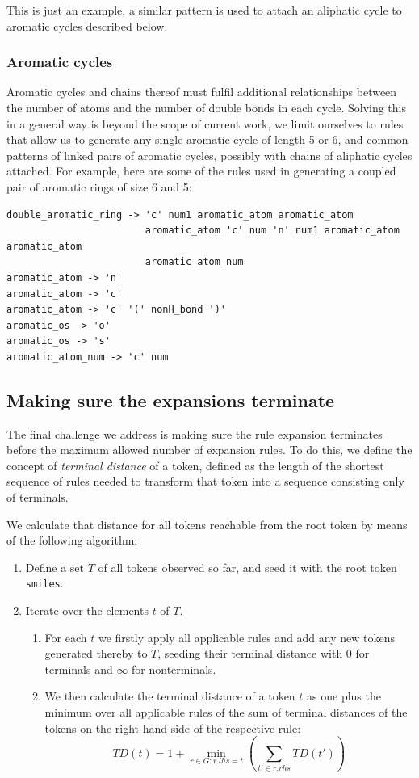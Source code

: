 \documentclass[11pt]{article}
\begin{document}
This is just an example, a similar pattern is used to attach an aliphatic cycle to aromatic cycles described below. 
\subsubsection{Aromatic cycles}
Aromatic cycles and chains thereof must fulfil additional relationships between the number of atoms and the number of double bonds in each cycle. Solving this in a general way is beyond the scope of current work, we limit ourselves to rules that allow us to generate any single aromatic cycle of length 5 or 6, and common patterns of linked pairs of aromatic cycles, possibly with chains of aliphatic cycles attached. For example, here are some of the rules used in generating a coupled pair of aromatic rings of size 6 and 5:

\begin{verbatim}
double_aromatic_ring -> 'c' num1 aromatic_atom aromatic_atom 
                        aromatic_atom 'c' num 'n' num1 aromatic_atom aromatic_atom
                        aromatic_atom_num
aromatic_atom -> 'n'
aromatic_atom -> 'c'
aromatic_atom -> 'c' '(' nonH_bond ')'
aromatic_os -> 'o'
aromatic_os -> 's'
aromatic_atom_num -> 'c' num
\end{verbatim}
\subsection{Making sure the expansions terminate}
The final challenge we address is making sure the rule expansion terminates before the maximum allowed number of expansion rules. To do this, we define the concept of \emph{terminal distance} of a token, defined as the length of the shortest sequence of rules needed to transform that token into a sequence consisting only of terminals. 

We calculate that distance for all tokens reachable from the root token by means of the following algorithm: 
\begin{enumerate}
	\item Define a set $T$ of all tokens observed so far, and seed it with the root token \verb+smiles+. 
	\item Iterate over the elements $t$ of $T$. 
	\begin{enumerate}
		\item For each $t$ we firstly apply all applicable rules and add any new tokens generated thereby to $T$, seeding their terminal distance with 0 for terminals and $\infty$ for nonterminals.
		\item We then calculate the terminal distance of a token $t$ as one plus the minimum over all applicable rules of the sum of terminal distances of the tokens on the right hand side of the respective rule:
		\begin{equation}\label{eq:td}
		TD(t)=1 + \min_{r \in G: r.lhs = t}\left(\sum_{t' \in r.rhs} TD(t') \right)
		\end{equation}
	\end{enumerate}
\end{enumerate}
\end{document}

